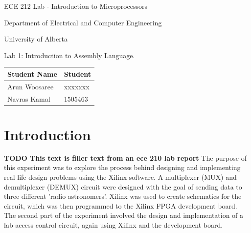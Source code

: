 \documentclass[letterpaper]{article}
\begin{document}
  \begin{titlepage}
    \begin{center}

      \LARGE
      ECE 212 Lab - Introduction to Microprocessors

      Department of Electrical and Computer Engineering

      University of Alberta

      \vspace{2cm}

      Lab 1: Introduction to Assembly Language.

      \vspace{5cm}
      \Large

      \begin{tabular}{ | m{5cm} | m{5cm} | }
        \hline
        Student Name & Student \\
        \hline
        Arun Woosaree & xxxxxxx \\
        \hline
        Navras Kamal & 1505463 \\
        \hline
      \end{tabular}




    \end{center}
\end{titlepage}


\tableofcontents

\newpage

\section{Introduction}
\textbf{TODO
  This text is filler text from an ece 210 lab report}
  The purpose of this experiment was to explore the process behind designing and implementing real life design problems using the Xilinx software. A multiplexer (MUX) and demultiplexer (DEMUX) circuit were designed with the goal of sending data to three different 'radio astronomers'. Xilinx was used to create schematics for the circuit, which was then programmed to the Xilinx FPGA development board. The second part of the experiment involved the design and implementation of a lab access control circuit, again using Xilinx and the development board.
\end{document}

